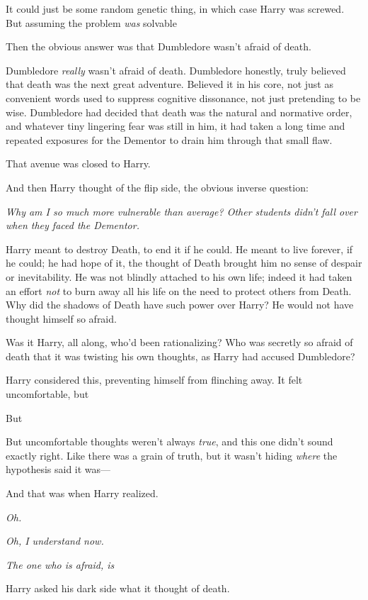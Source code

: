 It could just be some random genetic thing, in which case Harry was screwed.
But assuming the problem \emph{was} solvable{\el}

Then the obvious answer was that Dumbledore wasn't afraid of death.

Dumbledore \emph{really} wasn't afraid of death. Dumbledore honestly, truly
believed that death was the next great adventure. Believed it in his core, not
just as convenient words used to suppress cognitive dissonance, not just
pretending to be wise. Dumbledore had decided that death was the natural and
normative order, and whatever tiny lingering fear was still in him, it had
taken a long time and repeated exposures for the Dementor to drain him through
that small flaw.

That avenue was closed to Harry.

And then Harry thought of the flip side, the obvious inverse question:

\emph{Why am I so much more vulnerable than average? Other students didn't fall
over when they faced the Dementor.}

Harry meant to destroy Death, to end it if he could. He meant to live forever,
if he could; he had hope of it, the thought of Death brought him no sense of
despair or inevitability. He was not blindly attached to his own life; indeed
it had taken an effort \emph{not} to burn away all his life on the need to
protect others from Death. Why did the shadows of Death have such power over
Harry? He would not have thought himself so afraid.

Was it Harry, all along, who'd been rationalizing? Who was secretly so afraid
of death that it was twisting his own thoughts, as Harry had accused Dumbledore?

Harry considered this, preventing himself from flinching away. It felt
uncomfortable, but{\el}

But{\el}

But uncomfortable thoughts weren't always \emph{true}, and this one didn't
sound exactly right. Like there was a grain of truth, but it wasn't hiding
\emph{where} the hypothesis said it was—

And that was when Harry realized.

\emph{Oh.}

\emph{Oh, I understand now.}

\emph{The one who is afraid, is{\el}}

Harry asked his dark side what it thought of death.

